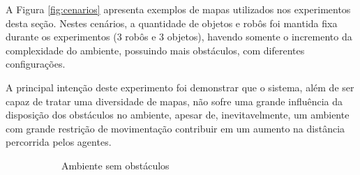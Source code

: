 A Figura \ref{fig:cenarios} apresenta exemplos de mapas utilizados nos experimentos desta seção.
Nestes cenários, a quantidade de objetos e robôs foi mantida fixa durante os experimentos (3 robôs e 3 objetos), havendo somente o incremento da complexidade do ambiente, possuindo mais obstáculos, com diferentes configurações.

A principal intenção deste experimento foi demonstrar que o sistema, além de ser capaz de tratar uma diversidade de mapas, não sofre uma grande influência da disposição dos obstáculos no ambiente, apesar de, inevitavelmente, um ambiente com grande restrição de movimentação contribuir em um aumento na distância percorrida pelos agentes.

\begin{figure}[h]
  \centering
  \setlength{\fboxsep}{0pt}
  \begin{subfigure}[t]{0.45\textwidth}
    \centering
    \caption{Ambiente sem obstáculos}
  \end{subfigure}
  \hspace{0.2cm}
  \begin{subfigure}[t]{0.45\textwidth}
    \centering

\end{subfigure}
\end{figure}

